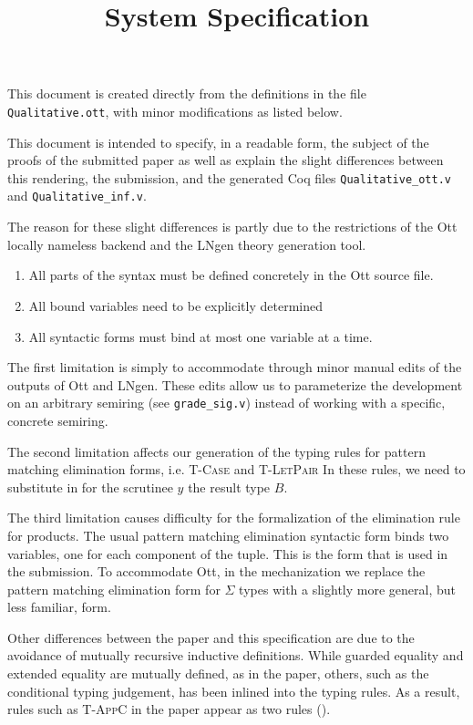 \documentclass{article}
\title{System Specification}
\begin{document}
\maketitle

This document is created directly from the definitions in the file
{\texttt{Qualitative.ott}}, with minor modifications as listed below.

This document is intended to specify, in a readable form, the subject of the
proofs of the submitted paper as well as explain the slight differences
between this rendering, the submission, and the generated Coq files
\texttt{Qualitative\_ott.v} and \texttt{Qualitative\_inf.v}.

The reason for these slight differences is partly due to the restrictions of
the Ott locally nameless backend and the LNgen theory generation tool.
\begin{enumerate}
\item All parts of the syntax must be defined concretely in the Ott source file. 
\item All bound variables need to be explicitly determined
\item All syntactic forms must bind at most one variable at a time.
\end{enumerate}

The first limitation is simply to accommodate through minor manual edits of
the outputs of Ott and LNgen. These edits allow us to parameterize the
development on an arbitrary semiring (see \texttt{grade\_sig.v}) instead of
working with a specific, concrete semiring. 

The second limitation affects our generation of the typing rules for pattern
matching elimination forms, i.e. \textsc{T-Case} and \textsc{T-LetPair}
In these rules, we need to substitute in for the scrutinee
$y$ the result type $B$. 

The third limitation causes difficulty for the formalization of the
elimination rule for products. The usual pattern matching elimination
syntactic form binds two variables, one for each component of the tuple. This
is the form that is used in the submission. To accommodate Ott, in the
mechanization we replace the pattern matching elimination form for $\Sigma$
types with a slightly more general, but less familiar, form.

Other differences between the paper and this specification are due to the
avoidance of mutually recursive inductive definitions. While guarded equality
and extended equality are mutually defined, as in the paper, others, such as
the conditional typing judgement, has been inlined into the typing rules. As a
result, rules such as \textsc{T-AppC} in the paper appear as two rules
().
\end{document}

